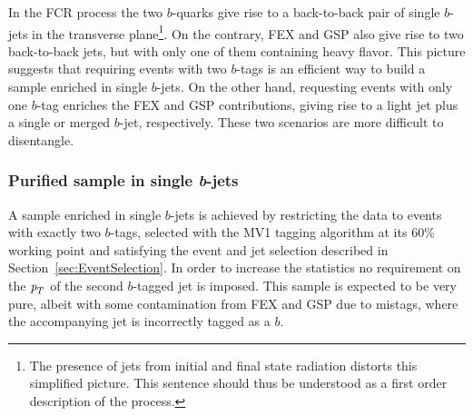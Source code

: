 In the FCR process the two $b$-quarks give rise to a back-to-back pair of single $b$-jets in the transverse plane\footnote{The presence of jets from initial and final state radiation distorts this simplified picture. This sentence should thus be understood as a first order description of the process.}. On the contrary, FEX and GSP also give rise to two back-to-back jets, but with only one of them containing heavy flavor. This picture suggests that requiring events with two $b$-tags is an efficient way to build a sample enriched in single $b$-jets.  On the other hand, requesting events with only one $b$-tag enriches the FEX and GSP contributions, giving rise to a light jet plus a single or merged $b$-jet, respectively.
These two scenarios are more difficult to disentangle. %

\subsubsection{Purified sample in single {\em b}-jets}

A sample enriched in single $b$-jets is achieved by restricting the data to events with exactly two $b$-tags,
selected with the MV1 tagging algorithm at its 60\% working point and satisfying the event and jet selection described in Section~\ref{sec:EventSelection}.
In order to increase the statistics no requirement on the ${\emph{p}_{T}}$ of the second $b$-tagged jet is imposed. 
This sample is expected to be very pure, albeit with some contamination from FEX and GSP due to mistags, where the accompanying jet is incorrectly tagged as a $b$.

